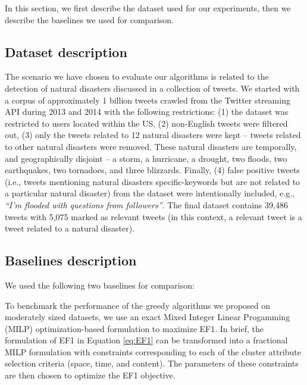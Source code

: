 

In this section, we first describe the dataset used for our experiments, then we describe the baselines we used for comparison.
\subsection{Dataset description}
The scenario we have chosen to evaluate our algorithms is related to the detection of natural disasters discussed in a collection of tweets.  We started with a corpus of approximately 1 billion tweets crawled from the Twitter streaming API during 2013 and 2014 with the following restrictions:
(1) the dataset was restricted to users located within the US, (2) non-English tweets were filtered out, (3) only the tweets related to 12 natural disasters were kept -- tweets related to other natural disasters were removed. These natural disasters are temporally, and geographically disjoint -- a storm, a hurricane,  a drought, two floods, two earthquakes, two tornadoes,  and three blizzards. Finally, (4) false positive tweets (i.e., tweets mentioning natural disasters specific-keywords but are not related to a particular natural disaster) from the dataset were intentionally included, e.g., \textit{\textquotedblleft I'm flooded with questions from followers\textquotedblright{}}. The final dataset contains 39,486 tweets with 5,075 marked as relevant tweets (in this context, a relevant tweet is a tweet related to a natural disaster).

\subsection{Baselines description}
We used the following two baselines for comparison:

 To benchmark the performance of the greedy algorithms we proposed on moderately sized datasets, we use an 
exact Mixed Integer Linear Progamming (MILP) optimization-based formulation to maximize EF1. In brief, the formulation of EF1 in Equation \ref{eq:EF1} can be transformed into a fractional MILP formulation with constraints corresponding to each of the cluster attribute selection criteria (space, time, and content).  The parameters of these constraints are then chosen to optimize the EF1 objective.

